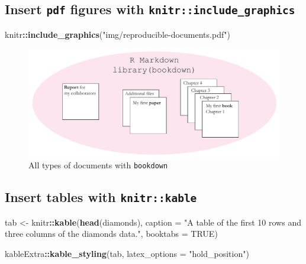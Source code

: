 \documentclass[12pt,]{article}
\newenvironment{Shaded}{\begin{snugshade}}{\end{snugshade}}
\newcommand{\KeywordTok}[1]{\textcolor[rgb]{0.13,0.29,0.53}{\textbf{#1}}}
\newcommand{\DataTypeTok}[1]{\textcolor[rgb]{0.13,0.29,0.53}{#1}}
\newcommand{\StringTok}[1]{\textcolor[rgb]{0.31,0.60,0.02}{#1}}
\newcommand{\OtherTok}[1]{\textcolor[rgb]{0.56,0.35,0.01}{#1}}
\newcommand{\OperatorTok}[1]{\textcolor[rgb]{0.81,0.36,0.00}{\textbf{#1}}}
\newcommand{\NormalTok}[1]{#1}
\begin{document}
\subsection{\texorpdfstring{Insert \texttt{pdf} figures with
\texttt{knitr::include\_graphics}}{Insert pdf figures with knitr::include\_graphics}}\label{insert-pdf-figures-with-knitrinclude_graphics}

\begin{Shaded}
\begin{Highlighting}[]
\NormalTok{knitr}\OperatorTok{::}\KeywordTok{include_graphics}\NormalTok{(}\StringTok{"img/reproducible-documents.pdf"}\NormalTok{)}
\end{Highlighting}
\end{Shaded}

\begin{figure}
\centering
\includegraphics{img/reproducible-documents.pdf}
\caption{\label{fig:bookdown-docs}All types of documents with
\texttt{bookdown}}
\end{figure}

\subsection{\texorpdfstring{Insert tables with
\texttt{knitr::kable}}{Insert tables with knitr::kable}}\label{insert-tables-with-knitrkable}

\begin{Shaded}
\begin{Highlighting}[]
\NormalTok{tab <-}\StringTok{ }\NormalTok{knitr}\OperatorTok{::}\KeywordTok{kable}\NormalTok{(}\KeywordTok{head}\NormalTok{(diamonds), }\DataTypeTok{caption =} \StringTok{"A table of the first 10 rows and three columns of the diamonds data."}\NormalTok{, }
    \DataTypeTok{booktabs =} \OtherTok{TRUE}\NormalTok{)}

\NormalTok{kableExtra}\OperatorTok{::}\KeywordTok{kable_styling}\NormalTok{(tab, }\DataTypeTok{latex_options =} \StringTok{"hold_position"}\NormalTok{)}
\end{Highlighting}
\end{Shaded}
\end{document}
